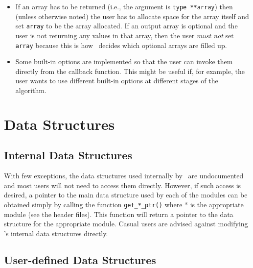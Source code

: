 \begin{description}
\begin{itemize}
\item If an array has to be returned (i.e., the argument is {\tt type
**array}) then (unless otherwise noted) the user has to allocate space for the
array itself and set {\tt *array} to be the array allocated.  If an output
array is optional and the user is not returning any values in that array, then
the user {\em must not} set {\tt *array} because this is how \BB\ decides
which optional arrays are filled up.

\item Some built-in options are implemented so that the user can invoke them
directly from the callback function. This might be useful if, for example,
the user wants to use different built-in options at different stages
of the algorithm.
\end{itemize}

\end{description}

\section{Data Structures}

\subsection{Internal Data Structures}

With few exceptions, the data structures used internally by \BB\
are undocumented and most users will not need to access them
directly. However, if such access is desired, a pointer to the main data
structure used by each of the modules can be obtained simply by calling
the function {\tt get\_*\_ptr()} where * is the appropriate module (see the
header files). This function will return a pointer to the data
structure for the appropriate module. Casual users are advised against
modifying \BB's internal data structures directly.

\subsection{User-defined Data Structures}

